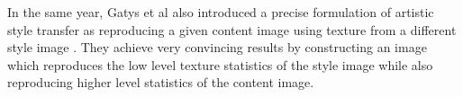 In the same year, Gatys et al also introduced a precise formulation of artistic style transfer as reproducing a given content image using texture from a different style image \cite{gatys2015neural}. They achieve very convincing results by constructing an image which reproduces the low level texture statistics of the style image while also reproducing higher level statistics of the content image.


